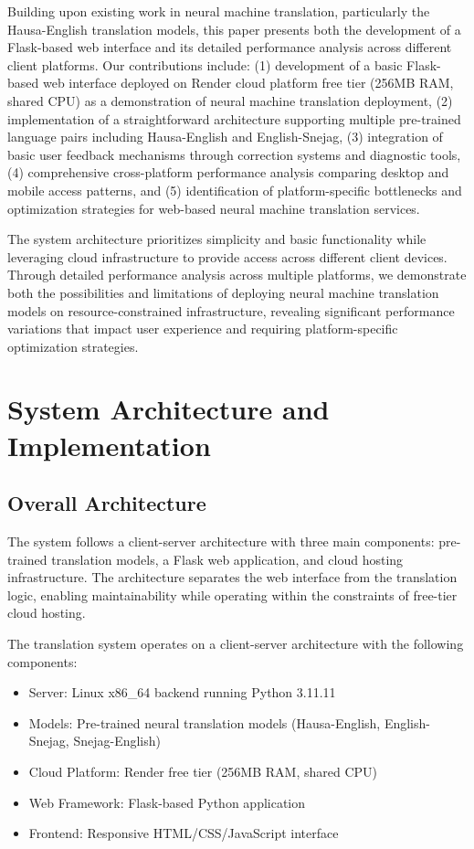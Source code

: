 \documentclass[conference]{IEEEtran}
\begin{document}
Building upon existing work in neural machine translation, particularly the Hausa-English translation models, this paper presents both the development of a Flask-based web interface and its detailed performance analysis across different client platforms. Our contributions include: (1) development of a basic Flask-based web interface deployed on Render cloud platform free tier (256MB RAM, shared CPU) as a demonstration of neural machine translation deployment, (2) implementation of a straightforward architecture supporting multiple pre-trained language pairs including Hausa-English and English-Snejag, (3) integration of basic user feedback mechanisms through correction systems and diagnostic tools, (4) comprehensive cross-platform performance analysis comparing desktop and mobile access patterns, and (5) identification of platform-specific bottlenecks and optimization strategies for web-based neural machine translation services.

The system architecture prioritizes simplicity and basic functionality while leveraging cloud infrastructure to provide access across different client devices. Through detailed performance analysis across multiple platforms, we demonstrate both the possibilities and limitations of deploying neural machine translation models on resource-constrained infrastructure, revealing significant performance variations that impact user experience and requiring platform-specific optimization strategies.

\section{System Architecture and Implementation}

\subsection{Overall Architecture}

The system follows a client-server architecture with three main components: pre-trained translation models, a Flask web application, and cloud hosting infrastructure. The architecture separates the web interface from the translation logic, enabling maintainability while operating within the constraints of free-tier cloud hosting.

The translation system operates on a client-server architecture with the following components:
\begin{itemize}
    \item Server: Linux x86\_64 backend running Python 3.11.11
    \item Models: Pre-trained neural translation models (Hausa-English, English-Snejag, Snejag-English)
    \item Cloud Platform: Render free tier (256MB RAM, shared CPU)
    \item Web Framework: Flask-based Python application
    \item Frontend: Responsive HTML/CSS/JavaScript interface
\end{itemize}
\end{document}
